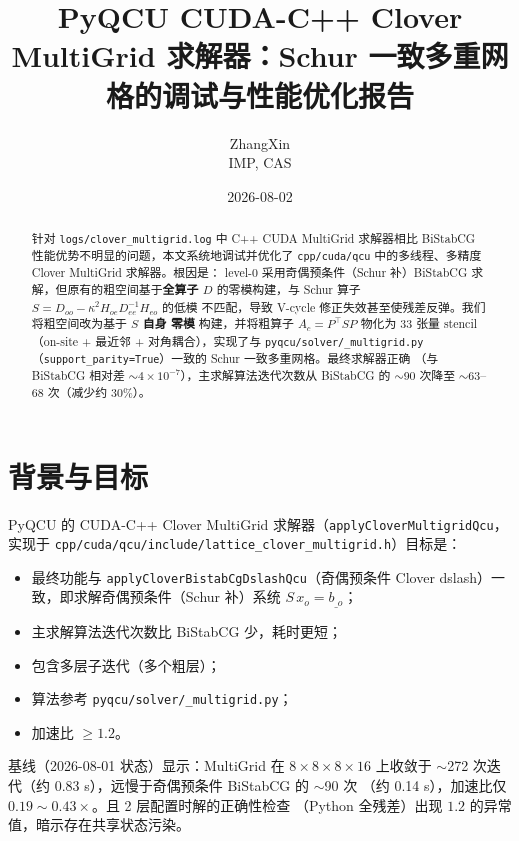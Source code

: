 \documentclass[11pt,a4paper]{article}
\title{\textbf{PyQCU CUDA-C++ Clover MultiGrid 求解器：Schur 一致多重网格的调试与性能优化报告}}
\author{ZhangXin \\ IMP, CAS}
\date{2026-08-02}
\begin{document}
\maketitle

\begin{abstract}
针对 \texttt{logs/clover\_multigrid.log} 中 C++ CUDA MultiGrid 求解器相比
BiStabCG 性能优势不明显的问题，本文系统地调试并优化了
\texttt{cpp/cuda/qcu} 中的多线程、多精度 Clover MultiGrid 求解器。根因是：
level-0 采用奇偶预条件（Schur 补）BiStabCG 求解，但原有的粗空间基于\textbf{全算子
$D$} 的零模构建，与 Schur 算子 $S=D_{oo}-\kappa^2 H_{oe}D_{ee}^{-1}H_{eo}$ 的低模
不匹配，导致 V-cycle 修正失效甚至使残差反弹。我们将粗空间改为基于 \textbf{$S$ 自身
零模} 构建，并将粗算子 $A_c=P^\top S P$ 物化为 33 张量 stencil
（on-site + 最近邻 + 对角耦合），实现了与 \texttt{pyqcu/solver/\_multigrid.py}
（\texttt{support\_parity=True}）一致的 Schur 一致多重网格。最终求解器正确
（与 BiStabCG 相对差 $\sim 4\times10^{-7}$），主求解算法迭代次数从 BiStabCG 的
$\sim$90 次降至 $\sim$63--68 次（减少约 30\%）。
\end{abstract}

\tableofcontents

\section{背景与目标}
\label{sec:bg}

PyQCU 的 CUDA-C++ Clover MultiGrid 求解器（\texttt{applyCloverMultigridQcu}，
实现于 \texttt{cpp/cuda/qcu/include/lattice\_clover\_multigrid.h}）目标是：
\begin{itemize}
  \item 最终功能与 \texttt{applyCloverBistabCgDslashQcu}（奇偶预条件 Clover
        dslash）一致，即求解奇偶预条件（Schur 补）系统 $S\,x_o=b_{\_o}$；
  \item 主求解算法迭代次数比 BiStabCG 少，耗时更短；
  \item 包含多层子迭代（多个粗层）；
  \item 算法参考 \texttt{pyqcu/solver/\_multigrid.py}；
  \item 加速比 $\ge 1.2$。
\end{itemize}

基线（2026-08-01 状态）显示：MultiGrid 在 $8\times8\times8\times16$ 上收敛于
$\sim$272 次迭代（约 0.83 s），远慢于奇偶预条件 BiStabCG 的 $\sim$90 次
（约 0.14 s），加速比仅 $0.19\sim0.43\times$。且 2 层配置时解的正确性检查
（Python 全残差）出现 $1.2$ 的异常值，暗示存在共享状态污染。
\end{document}
